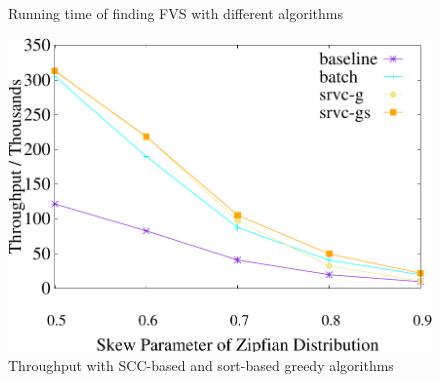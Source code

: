 \begin{figure}[t]
\begin{minipage}[b]{0.31\linewidth}
        \vspace{-2em}
        \caption{Running time of finding FVS with different algorithms}
        \label{fig:fvs:latency}
    \end{minipage}
\quad
    \begin{minipage}[b]{0.31\linewidth}
        \centering
        \includegraphics[width=\textwidth]{./exp_fig/greedy/tps}
        \vspace{-2em}
        \caption{Throughput with SCC-based and sort-based greedy algorithms}
        \label{fig:greedy:tps}
    \end{minipage}
\end{figure}

